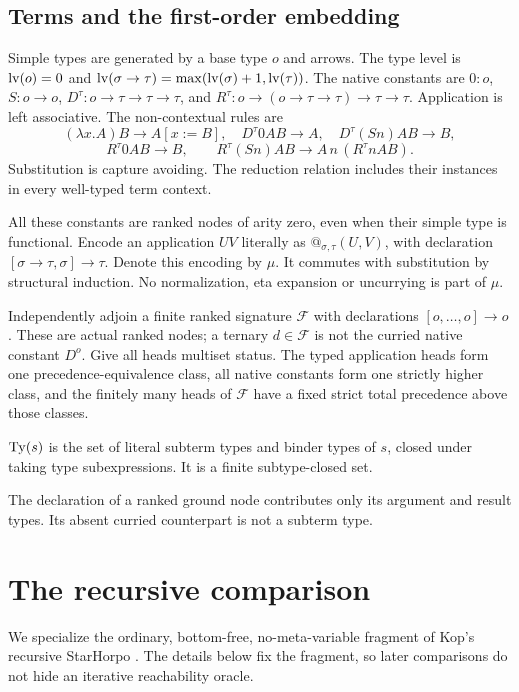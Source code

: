 \documentclass[11pt,a4paper]{article}
\begin{document}
\subsection{Terms and the first-order embedding}
Simple types are generated by a base type $o$ and arrows.  The type level is
$\operatorname{lv}(o)=0$ and $\operatorname{lv}(\sigma\to\tau)=\max(\operatorname{lv}(\sigma)+1,\operatorname{lv}(\tau))$.
The native constants are $0:o$, $S:o\to o$,
$D^\tau:o\to\tau\to\tau\to\tau$, and
$R^\tau:o\to(o\to\tau\to\tau)\to\tau\to\tau$.
Application is left associative.  The non-contextual rules are
\[
 (\lambda x.A)B\to A[x:=B],\quad
 D^\tau0AB\to A,\quad D^\tau(Sn)AB\to B,
\]
\[
 R^\tau0AB\to B,\qquad
 R^\tau(Sn)AB\to A\,n\,(R^\tau nAB).
\]
Substitution is capture avoiding.  The reduction relation includes their
instances in every well-typed term context.

All these constants are ranked nodes of arity zero, even when their simple
type is functional.  Encode an application $UV$ literally as
$@_{\sigma,\tau}(U,V)$, with declaration
$[\sigma\to\tau,\sigma]\to\tau$.  Denote this encoding by $\mu$.
It commutes with substitution by structural induction.  No normalization,
eta expansion or uncurrying is part of $\mu$.

Independently adjoin a finite ranked signature $\mathcal F$ with declarations
$[o,\ldots,o]\to o$.  These are actual ranked nodes; a ternary $d\in\mathcal F$
is not the curried native constant $D^o$.  Give all heads multiset status.
The typed application heads form one precedence-equivalence class, all native
constants form one strictly higher class, and the finitely many heads of
$\mathcal F$ have a fixed strict total precedence above those classes.

\begin{definition}
$\operatorname{Ty}(s)$ is the set of literal subterm types and binder types of $s$, closed
under taking type subexpressions.  It is a finite subtype-closed set.
\end{definition}
The declaration of a ranked ground node contributes only its argument and
result types.  Its absent curried counterpart is not a subterm type.

\section{The recursive comparison}
We specialize the ordinary, bottom-free, no-meta-variable fragment of Kop's
recursive StarHorpo \cite[Definition 5.19]{kop}.  The details below fix the
fragment, so later comparisons do not hide an iterative reachability oracle.
\end{document}
